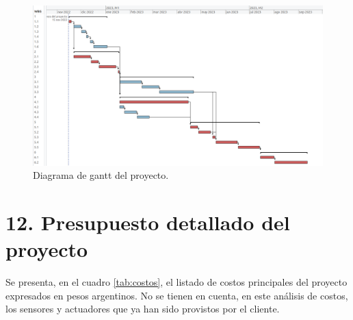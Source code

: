 \documentclass[
11pt, %
]{charter}
\begin{document}
\vspace{25px}

\begin{figure}[htpb]
\centering 
\includegraphics[width=1\textwidth]{./Figuras/GANT_sin_detalle.png}
\caption{Diagrama de gantt del proyecto.}
\label{fig:diagGantt}
\end{figure}

\vspace{25px}


\section{12. Presupuesto detallado del proyecto}
\label{sec:presupuesto}
Se presenta, en el cuadro \ref{tab:costos}, el listado de costos principales del proyecto expresados en pesos argentinos. No se tienen en cuenta, en este análisis de costos, los sensores y actuadores que ya han sido provistos por el cliente.
\end{document}
